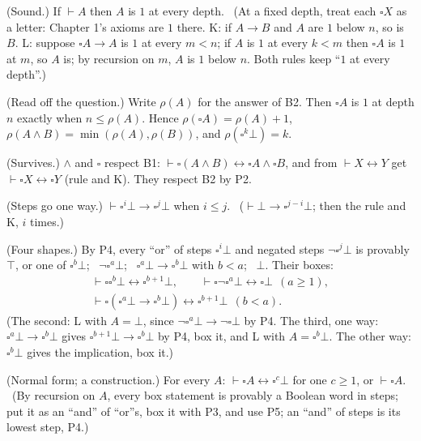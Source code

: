 \begin{lines}
\item[\lab{P1}] (Sound.) If $\vdash A$ then $A$ is $1$ at every depth. \ (At a fixed depth, treat each $\square X$ as a letter: Chapter 1's axioms are $1$ there. K: if $A \to B$ and $A$ are $1$ below $n$, so is $B$. L: suppose $\square A \to A$ is $1$ at every $m < n$; if $A$ is $1$ at every $k < m$ then $\square A$ is $1$ at $m$, so $A$ is; by recursion on $m$, $A$ is $1$ below $n$. Both rules keep ``$1$ at every depth''.)
\item[\lab{P2}] (Read off the question.) Write $\rho(A)$ for the answer of B2. Then $\square A$ is $1$ at depth $n$ exactly when $n \le \rho(A)$. Hence $\rho(\square A) = \rho(A) + 1$, $\rho(A \wedge B) = \min(\rho(A), \rho(B))$, and $\rho(\square^k\bot) = k$.
\item[\lab{P3}] (Survives.) $\wedge$ and $\square$ respect B1: $\vdash \square(A \wedge B) \leftrightarrow \square A \wedge \square B$, and from $\vdash X \leftrightarrow Y$ get $\vdash \square X \leftrightarrow \square Y$ (rule and K). They respect B2 by P2.
\item[\lab{P4}] (Steps go one way.) $\vdash \square^i\bot \to \square^j\bot$ when $i \le j$. \ ($\vdash \bot \to \square^{j-i}\bot$; then the rule and K, $i$ times.)
\item[\lab{P5}] (Four shapes.) By P4, every ``or'' of steps $\square^i\bot$ and negated steps $\neg\square^j\bot$ is provably $\top$, or one of $\square^b\bot$; \ $\neg\square^a\bot$; \ $\square^a\bot \to \square^b\bot$ with $b < a$; \ $\bot$. Their boxes:
\[ \begin{array}{l} \vdash \square\square^b\bot \leftrightarrow \square^{b+1}\bot, \qquad \vdash \square\neg\square^a\bot \leftrightarrow \square\bot \ \ (a \ge 1), \\[2pt] \vdash \square(\square^a\bot \to \square^b\bot) \leftrightarrow \square^{b+1}\bot \ \ (b < a). \end{array} \]
(The second: L with $A = \bot$, since $\neg\square^a\bot \to \neg\square\bot$ by P4. The third, one way: $\square^a\bot \to \square^b\bot$ gives $\square^{b+1}\bot \to \square^b\bot$ by P4, box it, and L with $A = \square^b\bot$. The other way: $\square^b\bot$ gives the implication, box it.)
\item[\lab{P6}] (Normal form; a construction.) For every $A$: $\vdash \square A \leftrightarrow \square^c\bot$ for one $c \ge 1$, or $\vdash \square A$. \ (By recursion on $A$, every box statement is provably a Boolean word in steps; put it as an ``and'' of ``or''s, box it with P3, and use P5; an ``and'' of steps is its lowest step, P4.)

\end{lines}
